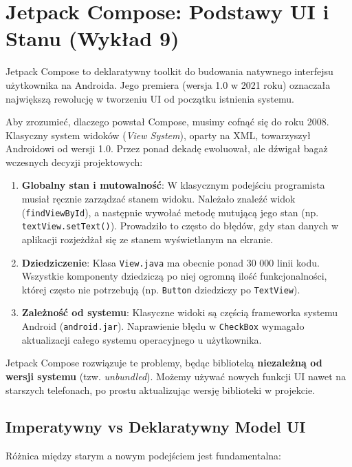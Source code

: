 \chapter{Jetpack Compose: Podstawy UI i Stanu (Wykład 9)}

Jetpack Compose to deklaratywny toolkit do budowania natywnego interfejsu użytkownika na Androida. Jego premiera (wersja 1.0 w 2021 roku) oznaczała największą rewolucję w tworzeniu UI od początku istnienia systemu.

Aby zrozumieć, dlaczego powstał Compose, musimy cofnąć się do roku 2008. Klasyczny system widoków (\textit{View System}), oparty na XML, towarzyszył Androidowi od wersji 1.0. Przez ponad dekadę ewoluował, ale dźwigał bagaż wczesnych decyzji projektowych:
\begin{enumerate}
    \item \textbf{Globalny stan i mutowalność}: W klasycznym podejściu programista musiał ręcznie zarządzać stanem widoku. Należało znaleźć widok (\texttt{findViewById}), a następnie wywołać metodę mutującą jego stan (np. \texttt{textView.setText()}). Prowadziło to często do błędów, gdy stan danych w aplikacji rozjeżdżał się ze stanem wyświetlanym na ekranie.
    \item \textbf{Dziedziczenie}: Klasa \texttt{View.java} ma obecnie ponad 30 000 linii kodu. Wszystkie komponenty dziedziczą po niej ogromną ilość funkcjonalności, której często nie potrzebują (np. \texttt{Button} dziedziczy po \texttt{TextView}).
    \item \textbf{Zależność od systemu}: Klasyczne widoki są częścią frameworka systemu Android (\texttt{android.jar}). Naprawienie błędu w \texttt{CheckBox} wymagało aktualizacji całego systemu operacyjnego u użytkownika.
\end{enumerate}

Jetpack Compose rozwiązuje te problemy, będąc biblioteką \textbf{niezależną od wersji systemu} (tzw. \textit{unbundled}). Możemy używać nowych funkcji UI nawet na starszych telefonach, po prostu aktualizując wersję biblioteki w projekcie.

\section{Imperatywny vs Deklaratywny Model UI}

Różnica między starym a nowym podejściem jest fundamentalna:


